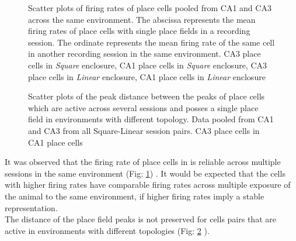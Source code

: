 \begin{figure}[htb!]
\centering
{}

\caption[Rate Remapping]{Scatter plots of firing rates of place cells pooled from CA1 and CA3  across the same environment. The abscissa represents the mean firing rates of place cells with single place fields in a recording session. The ordinate represents the mean firing rate of the same cell in another recording session in the same environment.  CA3 place cells in \emph{Square} enclosure,  CA1 place cells in \emph{Square} enclosure,  CA3 place cells in \emph{Linear} enclosure,  CA1 place cells in \emph{Linear} enclosure}
\label{fig:rateremapping}
\end{figure}





\begin{figure}[htb!]
\centering
{}
\caption[Place field Peak distances]{Scatter plots of the peak distance between the peaks of place cells which are active across several sessions and posses a single place field in environments with different topology. Data pooled from CA1 and CA3  from all Square-Linear session pairs.   CA3 place cells in   CA1 place cells }
\label{fig:pkDist}
\end{figure}
It was observed that the firing rate of place cells in is reliable across multiple sessions in the same environment (Fig:  \ref{fig:rateremapping}) . It would be expected that the cells with higher firing rates have comparable firing rates across multiple exposure of the animal to the same environment, if higher firing rates imply a stable representation. \\
The distance of the place field peaks is not preserved for cells pairs that are active in environments with different topologies (Fig: \ref{fig:pkDist} ).

